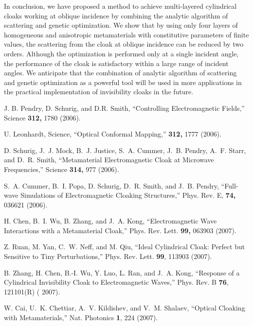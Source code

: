 \documentclass[12pt]{article} %
\begin{document}
In conclusion, we have proposed a method to achieve multi-layered
cylindrical cloaks working at oblique incidence by combining the
analytic algorithm of scattering and genetic optimization. We show
that by using only four layers of homogeneous and anisotropic
metamaterials with constitutive parameters of finite values, the
scattering from the cloak at oblique incidence can be reduced by two
orders. Although the optimization is performed only at a single
incident angle, the performance of the cloak is satisfactory within
a large range of incident angles. We anticipate that the combination
of analytic algorithm of scattering and genetic optimization as a
powerful tool will be used in more applications in the practical
implementation of invisibility cloaks in the future.


\begin{thebibliography}{99}

 J. B. Pendry, D. Schurig, and D.R. Smith,  ``Controlling Electromagnetic Fields,'' Science {\bf 312,} 1780 (2006).

 U. Leonhardt, Science, ``Optical Conformal Mapping,''  {\bf 312,} 1777 (2006).

 D. Schurig, J.~J. Mock, B.~J. Justice, S.~A. Cummer, J.~B. Pendry, A.~F. Starr, and D.~R. Smith, ``Metamaterial Electromagnetic Cloak at Microwave Frequencies,'' Science {\bf 314,}
977 (2006).

 S.~A. Cummer, B.~I. Popa, D. Schurig, D.~R. Smith, and J.~B. Pendry, ``Full-wave Simulations of Electromagnetic Cloaking Structures,'' Phys. Rev. E, {\bf 74,} 036621 (2006).

 H. Chen, B.~I. Wu, B. Zhang, and J.~A. Kong, ``Electromagnetic Wave Interactions with a Metamaterial Cloak,'' Phys. Rev. Lett. {\bf 99,} 063903 (2007).

 Z. Ruan, M. Yan, C.~W. Neff, and M. Qiu, ``Ideal Cylindrical Cloak: Perfect but Sensitive to Tiny Perturbations,'' Phys. Rev. Lett. {\bf 99}, 113903 (2007).

 B. Zhang, H. Chen, B.-I. Wu, Y. Luo, L. Ran, and J.~A. Kong, ``Response of a Cylindrical Invisibility Cloak to Electromagnetic Waves,'' Phys. Rev. B {\bf 76}, 121101(R) ( 2007).

 W. Cai, U.~K. Chettiar, A.~V. Kildishev, and V.~M. Shalaev, ``Optical Cloaking with Metamaterials,'' Nat. Photonics {\bf 1}, 224 (2007).


\end{thebibliography}
\end{document}

